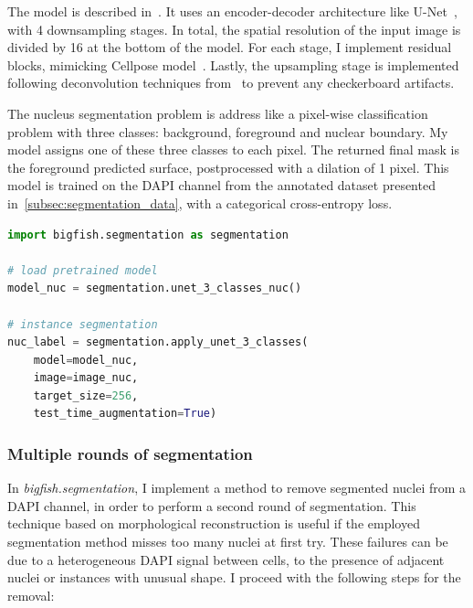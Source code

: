 The model is described in~\cite{Imbert_fq_2022}.
It uses an encoder-decoder architecture like U-Net~\cite{Ronneberger_unet}, with 4 downsampling stages.
In total, the spatial resolution of the input image is divided by 16 at the bottom of the model.
For each stage, I implement residual blocks, mimicking Cellpose model~\cite{stringer_cellpose_2021}.
Lastly, the upsampling stage is implemented following deconvolution techniques from~\cite{odena2016deconvolution} to prevent any checkerboard artifacts.

The nucleus segmentation problem is address like a pixel-wise classification problem with three classes: background, foreground and nuclear boundary.
My model assigns one of these three classes to each pixel.
The returned final mask is the foreground predicted surface, postprocessed with a dilation of 1 pixel.
This model is trained on the DAPI channel from the annotated dataset presented in~\ref{subsec:segmentation_data}, with a categorical cross-entropy loss.\\

\begin{minipage}{0.9\textwidth}
\begin{lstlisting}[language=Python]
import bigfish.segmentation as segmentation

# load pretrained model
model_nuc = segmentation.unet_3_classes_nuc()

# instance segmentation
nuc_label = segmentation.apply_unet_3_classes(
    model=model_nuc,
	image=image_nuc,
	target_size=256,
	test_time_augmentation=True)
\end{lstlisting}
\end{minipage}

\subsubsection{Multiple rounds of segmentation}

In \emph{bigfish.segmentation}, I implement a method to remove segmented nuclei from a DAPI channel, in order to perform a second round of segmentation.
This technique based on morphological reconstruction is useful if the employed segmentation method misses too many nuclei at first try.
These failures can be due to a heterogeneous DAPI signal between cells, to the presence of adjacent nuclei or instances with unusual shape.
I proceed with the following steps for the removal:

